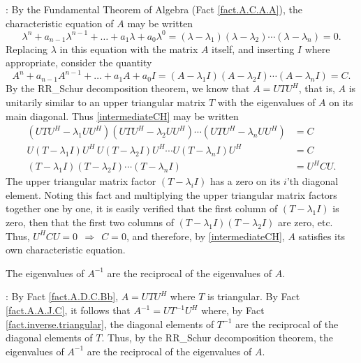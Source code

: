 \/: By the Fundamental Theorem of Algebra (Fact \ref{fact.A.C.A.A}), the characteristic equation of $A$ may be written
\begin{equation*}
    \lambda^{n}+a_{n-1}\lambda^{n-1}+\ldots + a_{1}\lambda +a_{0} \lambda^0=
    (\lambda - \lambda_{1})(\lambda-\lambda_{2})\cdots (\lambda-\lambda_{n})=0.
\end{equation*}
Replacing $\lambda$ in this equation with the matrix $A$ itself, and inserting $I$ where appropriate,
consider the quantity
\begin{equation}
    A^{n}+a_{n-1}A^{n-1}+\ldots + a_{1}A+a_{0} I =
    (A - \lambda_{1}I)(A -\lambda_{2}I)\cdots (A -\lambda_{n}I) = C.
    \label{intermediateCH}
\end{equation}
By the RR_Schur decomposition theorem, we know that $A=UTU^{H}$, that is,
$A$ is unitarily similar to an upper triangular matrix $T$ with the eigenvalues of $A$
on its main diagonal.  Thus \eqref{intermediateCH} may be written
\begin{align*}
    (UTU^{H} - \lambda_{1}UU^{H})(UTU^{H} -\lambda_{2}UU^{H})\cdots (UTU^{H} -\lambda_{n}UU^{H}) &= C \\
    U(T - \lambda_{1}I)U^{H}\,U(T -\lambda_{2}I)U^{H}\cdots U(T -\lambda_{n}I) U^{H} &= C \\
    (T - \lambda_{1}I) (T -\lambda_{2}I) \cdots (T -\lambda_{n}I)  &= U^{H} C U.
\end{align*}
The upper triangular matrix factor $(T-\lambda_{i}I)$ has a zero on its $i$'th diagonal
element.  Noting this fact and multiplying the upper triangular matrix factors together one by one, it is
easily verified that the first column of $(T - \lambda_{1}I)$ is zero, then that
the first two columns of $(T - \lambda_{1}I) (T -\lambda_{2}I)$ are
zero, etc.  Thus, $U^{H}CU=0\ \ \Rightarrow\ \ C=0$, and therefore, by
\eqref{intermediateCH}, $A$ satisfies its own characteristic equation.  \endproof 

\begin{fact} \label{fact.A.D.C.Bd} The eigenvalues of $A^{-1}$ are the reciprocal of the eigenvalues of $A$.
\end{fact}

\/: By Fact \ref{fact.A.D.C.Bb}, $A=UTU^{H}$ where $T$ is triangular.  By
Fact \ref{fact.A.A.J.C}, it follows that $A^{-1}=UT^{-1}U^{H}$ where, by Fact \ref{fact.inverse.triangular}, the
diagonal elements of $T^{-1}$ are the reciprocal of the diagonal
elements of $T$.  Thus, by the RR_Schur decomposition theorem, the eigenvalues of $A^{-1}$ are the
reciprocal of the eigenvalues of $A$. \endproof

